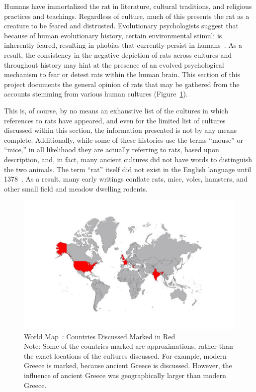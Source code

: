 \documentclass[12pt]{article}
\begin{document}
Humans have immortalized the rat in literature, cultural traditions, and religious practices and teachings. Regardless of culture, much of this presents the rat as a creature to be feared and distrusted. Evolutionary psychologists suggest that because of human evolutionary history, certain environmental stimuli is inherently feared, resulting in phobias that currently persist in humans~\cite{Buss2004}. As a result, the consistency in the negative depiction of rats across cultures and throughout history may hint at the presence of an evolved psychological mechanism to fear or detest rats within the human brain. This section of this project documents the general opinion of rats that may be gathered from the accounts stemming from various human cultures (Figure~\ref{WorldMapFigure}).

This is, of course, by no means an exhaustive list of the cultures in which references to rats have appeared, and even for the limited list of cultures discussed within this section, the information presented is not by any means complete. Additionally, while some of these histories use the terms ``mouse'' or ``mice,'' in all likelihood they are actually referring to rats, based upon description, and, in fact, many ancient cultures did not have words to distinguish the two animals. The term ``rat'' itself did not exist in the English language until 1378~\cite{ONeill}. As a result, many early writings conflate rats, mice, voles, hamsters, and other small field and meadow dwelling rodents.
\begin{figure}
\centering
\includegraphics[width=6in,trim={0 .4in 0 .4in},clip]{WorldMap}
\caption{World Map~\cite{VisitedCountries2014}: Countries Discussed Marked in Red\\
Note: Some of the countries marked are approximations, rather than the exact locations of the cultures discussed. For example, modern Greece is marked, because ancient Greece is discussed. However, the influence of ancient Greece was geographically larger than modern Greece.}
\label{WorldMapFigure}
\end{figure}
\end{document}
